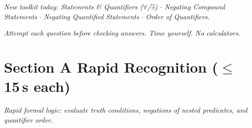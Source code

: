 \documentclass[11pt,a4paper]{article}
\begin{document}
\noindent\textit{New toolkit today: Statements \& Quantifiers ($\forall$/$\exists$) $\cdot$ Negating Compound Statements $\cdot$ Negating Quantified Statements $\cdot$ Order of Quantifiers.}

\vspace{2pt}
\noindent\textit{Attempt each question before checking answers. Time yourself. No calculators.}

\section*{Section A \quad Rapid Recognition \hfill{\normalfont\small($\leq$15\,s each)}}

\noindent\textit{Rapid formal logic: evaluate truth conditions, negations of nested predicates, and quantifier order.}
\end{document}
